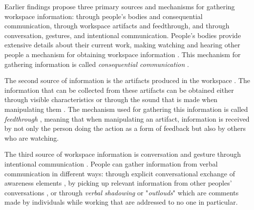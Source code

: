 \begin{table}[!ht]
\begin{tabular}{lll}
        \end{tabular}
        \vspace{1em}
        \label{tab:workspaceElementsPast}
    \end{table}


    Earlier findings \cite{segalEffectsChecklistInterface1994, normanThingsThatMake1993, dixHumanComputerInteraction2003, hutchinsTechnologyTeamNavigation1990, gutwinDescriptiveFrameworkWorkspace2002} propose three primary sources and mechanisms for gathering workspace information: through people's bodies and consequential communication, through workspace artifacts and feedthrough, and through conversation, gestures, and intentional communication. People's bodies provide extensive details about their current work, making watching and hearing other people a mechanism for obtaining workspace information \cite{gutwinDescriptiveFrameworkWorkspace2002, segalEffectsChecklistInterface1994}. This mechanism for gathering information is called \textit{consequential communication} \cite{segalEffectsChecklistInterface1994}.

    The second source of information is the artifacts produced in the workspace \cite{dixHumanComputerInteraction2003, gaverSoundSupportCollaboration1991}. The information that can be collected from these artifacts can be obtained either through visible characteristics \cite{gutwinDescriptiveFrameworkWorkspace2002} or through the sound that is made when manipulating them \cite{gaverSoundSupportCollaboration1991}. The mechanism used for gathering this information is called \textit{feedthrough} \cite{dixHumanComputerInteraction2003}, meaning that when manipulating an artifact, information is received by not only the person doing the action as a form of feedback but also by others who are watching.

    The third source of workspace information is conversation and gesture through intentional communication \cite{clarkUsingLanguage1996, heathUnpackingCollaborationInteractional1994, birdwhistellIntroductionKinesicsAnnotation1952}. People can gather information from verbal communication in different ways: through explicit conversational exchange of awareness elements \cite{gutwinDescriptiveFrameworkWorkspace2002}, by picking up relevant information from other peoples' conversations \cite{gutwinDescriptiveFrameworkWorkspace2002}, or through \textit{verbal shadowing} or "\textit{outlouds}" \cite{heathUnpackingCollaborationInteractional1994} which are comments made by individuals while working that are addressed to no one in particular.

